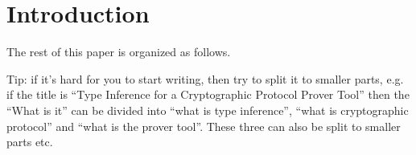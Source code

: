 \newpage
\section{Introduction}


The rest of this paper is organized as follows.

Tip: if it's hard for you to start writing, then try to split it to smaller parts, e.g. if the title is ``Type Inference for a Cryptographic Protocol Prover Tool'' then the ``What is it'' can be divided into ``what is type inference'', ``what is cryptographic protocol'' and ``what is the prover tool''. These three can also be split to smaller parts etc.

